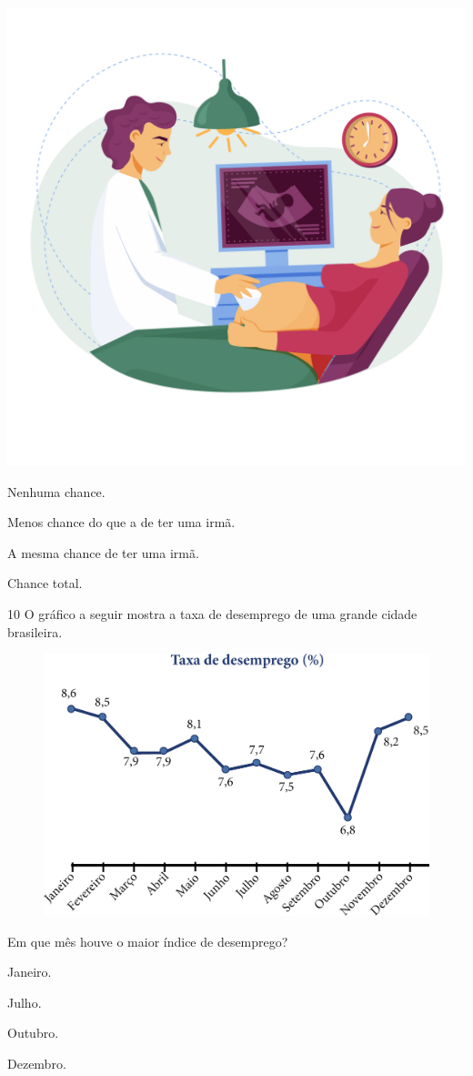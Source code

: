 \begin{center}
\includegraphics[width=.6\textwidth]{media/image78c.jpeg}
\end{center}

\begin{escolha}
\item
  Nenhuma chance.
\item
  Menos chance do que a de ter uma irmã.
\item
  A mesma chance de ter uma irmã.
\item
  Chance total.
\end{escolha}

\num{10} O gráfico a seguir mostra a taxa de desemprego de uma grande cidade
brasileira.

\begin{figure}[htpb!]
\centering
\includegraphics[width=.7\textwidth]{media/image79.png}
\end{figure}

Em que mês houve o maior índice de desemprego?

\begin{multicols}{2}
\begin{escolha}
\item
  Janeiro.
\item
  Julho.
\item
  Outubro.
\item
  Dezembro.
\end{escolha}
\end{multicols}

